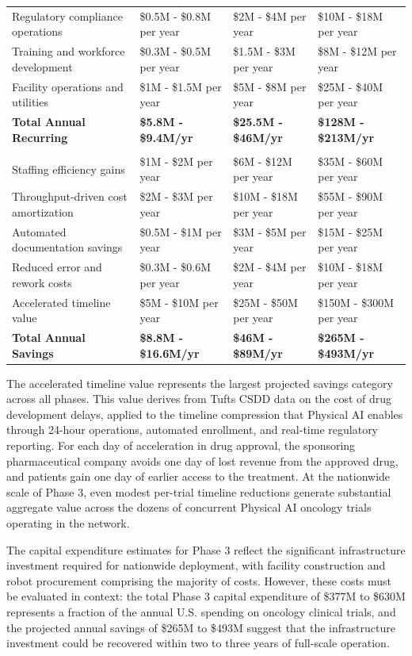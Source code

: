 \begin{longtable}{>{\raggedright\arraybackslash}p{3cm} >{\raggedright\arraybackslash}p{4.1cm} >{\raggedright\arraybackslash}p{4.1cm} >{\raggedright\arraybackslash}p{4.4cm}}
Regulatory compliance operations & \$0.5M - \$0.8M per year & \$2M - \$4M per year & \$10M - \$18M per year \\
Training and workforce development & \$0.3M - \$0.5M per year & \$1.5M - \$3M per year & \$8M - \$12M per year \\
Facility operations and utilities & \$1M - \$1.5M per year & \$5M - \$8M per year & \$25M - \$40M per year \\
\textbf{Total Annual Recurring} & \textbf{\$5.8M - \$9.4M/yr} & \textbf{\$25.5M - \$46M/yr} & \textbf{\$128M - \$213M/yr} \\
\midrule
\multicolumn{4}{l}{\textit{Projected Annual Savings vs. Traditional Trials}} \\
\midrule
Staffing efficiency gains & \$1M - \$2M per year & \$6M - \$12M per year & \$35M - \$60M per year \\
Throughput-driven cost amortization & \$2M - \$3M per year & \$10M - \$18M per year & \$55M - \$90M per year \\
Automated documentation savings & \$0.5M - \$1M per year & \$3M - \$5M per year & \$15M - \$25M per year \\
Reduced error and rework costs & \$0.3M - \$0.6M per year & \$2M - \$4M per year & \$10M - \$18M per year \\
Accelerated timeline value & \$5M - \$10M per year & \$25M - \$50M per year & \$150M - \$300M per year \\
\textbf{Total Annual Savings} & \textbf{\$8.8M - \$16.6M/yr} & \textbf{\$46M - \$89M/yr} & \textbf{\$265M - \$493M/yr} \\
\end{longtable}

The accelerated timeline value represents the largest projected savings
category across all phases. This value derives from Tufts CSDD \cite{tufts-delay}
data on the cost of drug development delays, applied to the timeline
compression that Physical AI enables through 24-hour operations, automated
enrollment, and real-time regulatory reporting. For each day of acceleration in
drug approval, the sponsoring pharmaceutical company avoids one day of lost
revenue from the approved drug, and patients gain one day of earlier access to
the treatment. At the nationwide scale of Phase 3, even modest per-trial
timeline reductions generate substantial aggregate value across the dozens of
concurrent Physical AI oncology trials operating in the network.

The capital expenditure estimates for Phase 3 reflect the significant
infrastructure investment required for nationwide deployment, with facility
construction and robot procurement comprising the majority of costs. However,
these costs must be evaluated in context: the total Phase 3 capital expenditure
of \$377M to \$630M represents a fraction of the annual U.S. spending on
oncology clinical trials, and the projected annual savings of \$265M to \$493M
suggest that the infrastructure investment could be recovered within two to
three years of full-scale operation.

